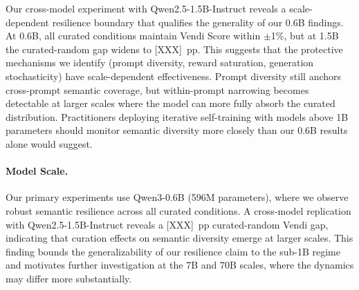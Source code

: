 Our cross-model experiment with Qwen2.5-1.5B-Instruct reveals a scale-dependent resilience boundary that qualifies the generality of our 0.6B findings. At 0.6B, all curated conditions maintain Vendi Score within $\pm$1\%, but at 1.5B the curated-random gap widens to [XXX]~pp. This suggests that the protective mechanisms we identify (prompt diversity, reward saturation, generation stochasticity) have scale-dependent effectiveness. Prompt diversity still anchors cross-prompt semantic coverage, but within-prompt narrowing becomes detectable at larger scales where the model can more fully absorb the curated distribution. Practitioners deploying iterative self-training with models above 1B parameters should monitor semantic diversity more closely than our 0.6B results alone would suggest.



\paragraph{Model Scale.}
Our primary experiments use Qwen3-0.6B (596M parameters), where we observe robust semantic resilience across all curated conditions. A cross-model replication with Qwen2.5-1.5B-Instruct reveals a [XXX]~pp curated-random Vendi gap, indicating that curation effects on semantic diversity emerge at larger scales. This finding bounds the generalizability of our resilience claim to the sub-1B regime and motivates further investigation at the 7B and 70B scales, where the dynamics may differ more substantially.






